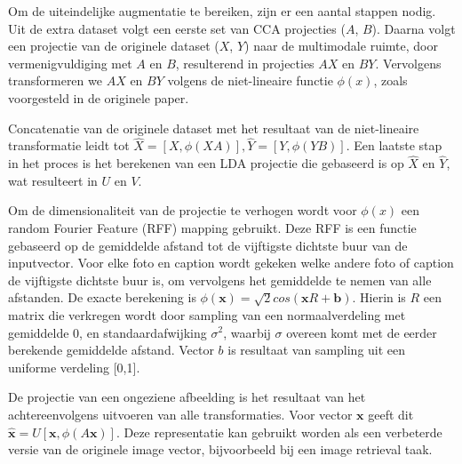 Om de uiteindelijke augmentatie te bereiken, zijn er een aantal stappen nodig. Uit de extra dataset volgt een eerste set van CCA projecties ($A$, $B$). Daarna volgt een projectie van de originele dataset ($X$, $Y$) naar de multimodale ruimte, door vermenigvuldiging met $A$ en $B$, resulterend in projecties $AX$ en $BY$. Vervolgens transformeren we $AX$ en $BY$ volgens de niet-lineaire functie $\phi(x)$, zoals voorgesteld in de originele paper.

Concatenatie van de originele dataset met het resultaat van de niet-lineaire transformatie leidt tot $\hat{X} = [X, \phi(XA)], \hat{Y} = [Y, \phi(YB)]$. Een laatste stap in het proces is het berekenen van een LDA projectie die gebaseerd is op $\hat{X}$ en $\hat{Y}$, wat resulteert in $U$ en $V$.

Om de dimensionaliteit van de projectie te verhogen wordt voor $\phi(x)$ een random Fourier Feature (RFF) mapping gebruikt. Deze RFF is een functie gebaseerd op de gemiddelde afstand tot de vijftigste dichtste buur van de inputvector. Voor elke foto en caption wordt gekeken welke andere foto of caption de vijftigste dichtste buur is, om vervolgens het gemiddelde te nemen van alle afstanden. De exacte berekening is $\phi(\mathbf{x})=\sqrt{2}cos(\mathbf{x}R+\mathbf{b})$. Hierin is $R$ een matrix die verkregen wordt door sampling van een normaalverdeling met gemiddelde 0, en standaardafwijking $\sigma^2$, waarbij $\sigma$ overeen komt met de eerder berekende gemiddelde afstand. Vector $b$ is resultaat van sampling uit een uniforme verdeling [0,1].

De projectie van een ongeziene afbeelding is het resultaat van het achtereenvolgens uitvoeren van alle transformaties. Voor vector $\mathbf{x}$ geeft dit $\mathbf{\hat{x}} = U[\mathbf{x}, \phi(A\mathbf{x})]$. Deze representatie kan gebruikt worden als een verbeterde versie van de originele image vector, bijvoorbeeld bij een image retrieval taak.
